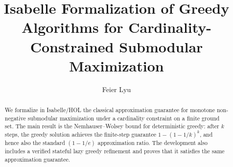 \documentclass[11pt,a4paper]{article}
\begin{document}
\title{Isabelle Formalization of Greedy Algorithms for Cardinality-Constrained Submodular Maximization}
\author{Feier Lyu}
\maketitle

\begin{abstract}
We formalize in Isabelle/HOL the classical approximation guarantee for monotone
non-negative submodular maximization under a cardinality constraint on a finite
ground set. The main result is the Nemhauser--Wolsey bound for deterministic
greedy: after $k$ steps, the greedy solution achieves the finite-step guarantee
$1 - (1 - 1/k)^k$, and hence also the standard $(1 - 1/e)$ approximation ratio.
The development also includes a verified stateful lazy greedy refinement and
proves that it satisfies the same approximation guarantee.
\end{abstract}

\tableofcontents



\nocite{NemhauserWolseyFisher1978}



\end{document}
